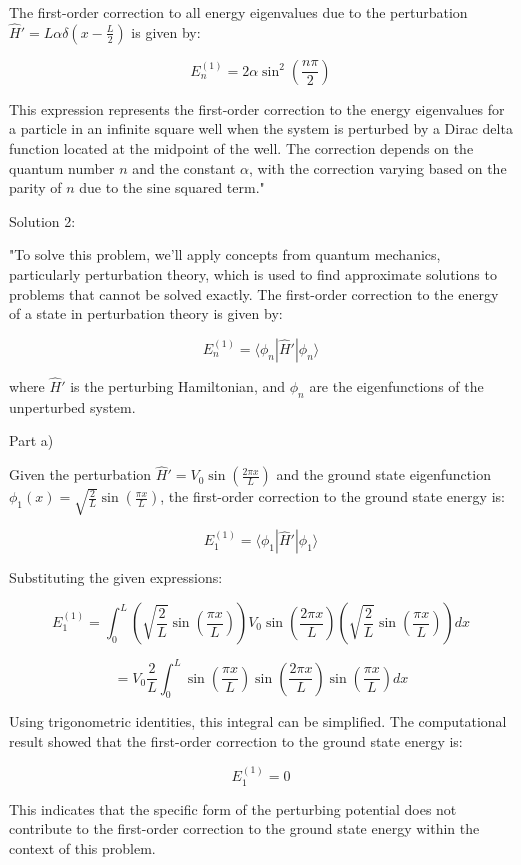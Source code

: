 The first-order correction to all energy eigenvalues due to the perturbation \( \hat{H}' = L\alpha \delta\left(x - \frac{L}{2} \right) \) is given by:

\[ E_n^{(1)} = 2\alpha \sin^2\left(\frac{n \pi}{2}\right) \]

This expression represents the first-order correction to the energy eigenvalues for a particle in an infinite square well when the system is perturbed by a Dirac delta function located at the midpoint of the well. The correction depends on the quantum number \( n \) and the constant \( \alpha \), with the correction varying based on the parity of \( n \) due to the sine squared term."

Solution 2: 

"To solve this problem, we'll apply concepts from quantum mechanics, particularly perturbation theory, which is used to find approximate solutions to problems that cannot be solved exactly. The first-order correction to the energy of a state in perturbation theory is given by:

\[ E_n^{(1)} = \langle \phi_n | \hat{H}' | \phi_n \rangle \]

where \(\hat{H}'\) is the perturbing Hamiltonian, and \(\phi_n\) are the eigenfunctions of the unperturbed system.

Part a)

Given the perturbation \(\hat{H}' = V_0 \sin\left(\frac{2 \pi x}{L} \right)\) and the ground state eigenfunction \(\phi_1(x) = \sqrt{\frac{2}{L}} \sin\left(\frac{\pi x}{L} \right)\), the first-order correction to the ground state energy is:

\[ E_1^{(1)} = \langle \phi_1 | \hat{H}' | \phi_1 \rangle \]

Substituting the given expressions:

\[ E_1^{(1)} = \int_{0}^{L} \left( \sqrt{\frac{2}{L}} \sin\left(\frac{\pi x}{L} \right) \right) V_0 \sin\left(\frac{2 \pi x}{L} \right) \left( \sqrt{\frac{2}{L}} \sin\left(\frac{\pi x}{L} \right) \right) dx \]

\[ = V_0 \frac{2}{L} \int_{0}^{L} \sin\left(\frac{\pi x}{L} \right) \sin\left(\frac{2 \pi x}{L} \right) \sin\left(\frac{\pi x}{L} \right) dx \]

Using trigonometric identities, this integral can be simplified. The computational result showed that the first-order correction to the ground state energy is:

\[ E_1^{(1)} = 0 \]

This indicates that the specific form of the perturbing potential does not contribute to the first-order correction to the ground state energy within the context of this problem.

